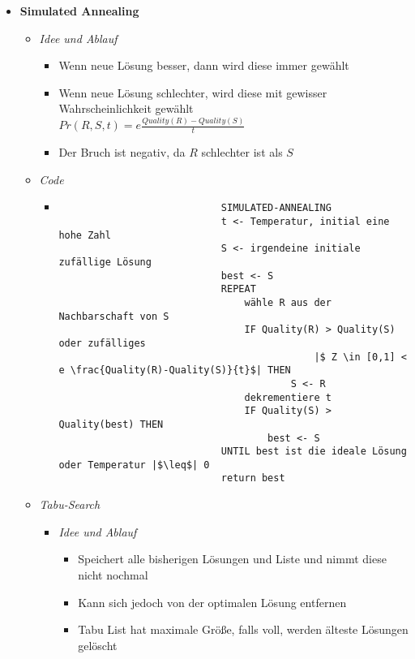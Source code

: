 \begin{itemize}
\pagebreak

        \item \textbf{Simulated Annealing}
            \begin{itemize}
                \item \textit{Idee und Ablauf}
                    \begin{itemize}
                        \item Wenn neue Lösung besser, dann wird diese immer gewählt
                        \item Wenn neue Lösung schlechter, wird diese mit gewisser Wahrscheinlichkeit gewählt \\
                                $Pr(R,S,t) = e \frac{Quality(R)-Quality(S)}{t}$
                        \item Der Bruch ist negativ, da $R$ schlechter ist als $S$
                    \end{itemize}

                \item \textit{Code}
                    \begin{itemize}
                        \item[]
                            \begin{verbatim}
                            SIMULATED-ANNEALING
                            t <- Temperatur, initial eine hohe Zahl
                            S <- irgendeine initiale zufällige Lösung
                            best <- S
                            REPEAT
                                wähle R aus der Nachbarschaft von S
                                IF Quality(R) > Quality(S) oder zufälliges
                                            |$ Z \in [0,1] < e \frac{Quality(R)-Quality(S)}{t}$| THEN
                                        S <- R
                                dekrementiere t
                                IF Quality(S) > Quality(best) THEN
                                    best <- S 
                            UNTIL best ist die ideale Lösung oder Temperatur |$\leq$| 0
                            return best
                            \end{verbatim}
                    \end{itemize}

                \item \textit{Tabu-Search}
                    \begin{itemize}
                        \item \textit{Idee und Ablauf}
                            \begin{itemize}
                                \item Speichert alle bisherigen Lösungen und Liste und nimmt diese nicht nochmal
                                \item Kann sich jedoch von der optimalen Lösung entfernen
                                \item Tabu List hat maximale Grö\ss e, falls voll, werden älteste Lösungen gelöscht
                            \end{itemize}
                        

\end{itemize}
\end{itemize}
\end{itemize}

